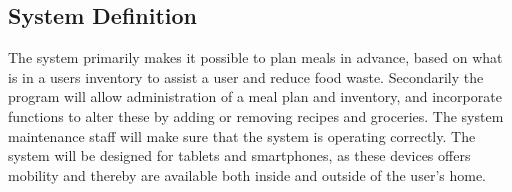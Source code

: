 \subsection{System Definition}
The system primarily makes it possible to plan meals in advance, based on what is in a users inventory to assist a user and reduce food waste.
Secondarily the program will allow administration of a meal plan and inventory, and incorporate functions to alter these by adding or removing recipes and groceries. The system maintenance staff will make sure that the system is operating correctly.
The system will be designed for tablets and smartphones, as these devices offers mobility and thereby are available both inside and outside of the user's home.